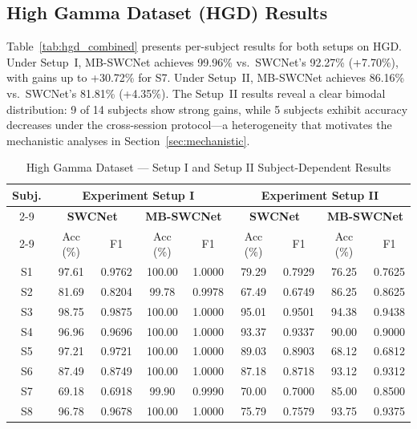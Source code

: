 \documentclass[conference]{IEEEtran}
\begin{document}
\subsection{High Gamma Dataset (HGD) Results}

Table~\ref{tab:hgd_combined} presents per-subject results for both setups on HGD. Under Setup~I, MB-SWCNet achieves 99.96\% vs.\ SWCNet's 92.27\% (+7.70\%), with gains up to +30.72\% for S7. Under Setup~II, MB-SWCNet achieves 86.16\% vs.\ SWCNet's 81.81\% (+4.35\%). The Setup~II results reveal a clear bimodal distribution: 9 of 14 subjects show strong gains, while 5 subjects exhibit accuracy decreases under the cross-session protocol---a heterogeneity that motivates the mechanistic analyses in Section~\ref{sec:mechanistic}.

\begin{table}[t]
\caption{High Gamma Dataset --- Setup I and Setup II Subject-Dependent Results}
\begin{center}
\setlength{\tabcolsep}{3.5pt}
\begin{tabular}{|c|cc|cc||cc|cc|}
\hline
\multirow{3}{*}{\textbf{Subj.}} &
\multicolumn{4}{c||}{\textbf{Experiment Setup I}} &
\multicolumn{4}{c|}{\textbf{Experiment Setup II}} \\
\cline{2-9}
& \multicolumn{2}{c|}{\textbf{SWCNet \cite{b1}}} & \multicolumn{2}{c||}{\textbf{MB-SWCNet}} &
  \multicolumn{2}{c|}{\textbf{SWCNet \cite{b1}}} & \multicolumn{2}{c|}{\textbf{MB-SWCNet}} \\
\cline{2-9}
& Acc (\%) & F1 & Acc (\%) & F1 & Acc (\%) & F1 & Acc (\%) & F1 \\
\hline
S1  & 97.61 & 0.9762 & 100.00 & 1.0000 & 79.29 & 0.7929 & 76.25  & 0.7625 \\
S2  & 81.69 & 0.8204 & 99.78  & 0.9978 & 67.49 & 0.6749 & 86.25  & 0.8625 \\
S3  & 98.75 & 0.9875 & 100.00 & 1.0000 & 95.01 & 0.9501 & 94.38  & 0.9438 \\
S4  & 96.96 & 0.9696 & 100.00 & 1.0000 & 93.37 & 0.9337 & 90.00  & 0.9000 \\
S5  & 97.21 & 0.9721 & 100.00 & 1.0000 & 89.03 & 0.8903 & 68.12  & 0.6812 \\
S6  & 87.49 & 0.8749 & 100.00 & 1.0000 & 87.18 & 0.8718 & 93.12  & 0.9312 \\
S7  & 69.18 & 0.6918 & 99.90  & 0.9990 & 70.00 & 0.7000 & 85.00  & 0.8500 \\
S8  & 96.78 & 0.9678 & 100.00 & 1.0000 & 75.79 & 0.7579 & 93.75  & 0.9375 \\

\end{tabular}
\end{center}
\end{table}
\end{document}
